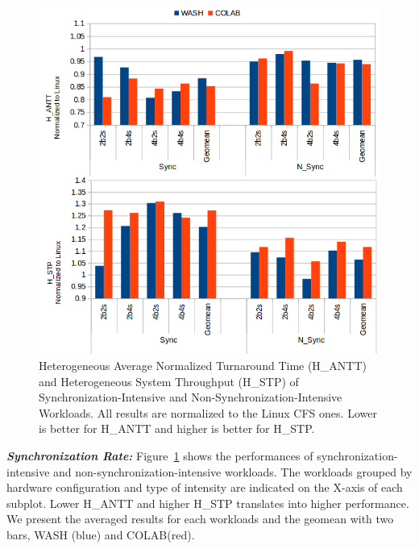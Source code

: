 \begin{figure}
\centering
\includegraphics[scale=0.39]{figures/sync.png}
\caption{Heterogeneous Average Normalized Turnaround Time (H\_ANTT) and Heterogeneous System Throughput (H\_STP) of Synchronization-Intensive and Non-Synchronization-Intensive Workloads. All results are normalized to the Linux CFS ones. Lower is better for H\_ANTT and higher is better for H\_STP.}
\label{sync}
\end{figure} 

\textbf{\textit{Synchronization Rate:}}
Figure~\ref{sync} shows the performances of synchronization-intensive and non-synchronization-intensive workloads. The workloads grouped by hardware configuration and type of intensity are indicated on the X-axis of each subplot. Lower H\_ANTT and higher H\_STP translates into higher performance. We present the averaged results for each workloads and the geomean with two bars, WASH (blue) and COLAB(red).

